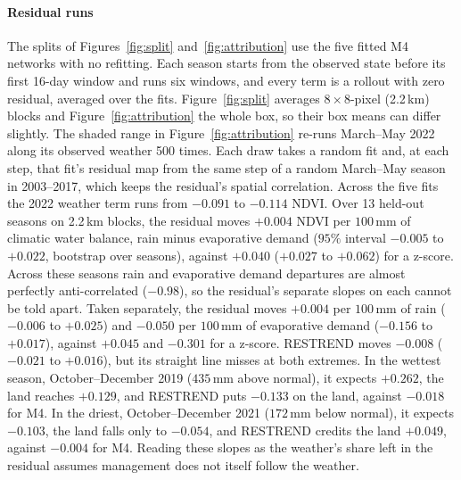 \documentclass[letterpaper]{article} %
\begin{document}
\paragraph{Residual runs} The splits of Figures~\ref{fig:split} and~\ref{fig:attribution} use the five fitted M4 networks with no refitting. Each season starts from the observed state before its first 16-day window and runs six windows, and every term is a rollout with zero residual, averaged over the fits. Figure~\ref{fig:split} averages $8\times8$-pixel (2.2\,km) blocks and Figure~\ref{fig:attribution} the whole box, so their box means can differ slightly. The shaded range in Figure~\ref{fig:attribution} re-runs March--May 2022 along its observed weather 500 times. Each draw takes a random fit and, at each step, that fit's residual map from the same step of a random March--May season in 2003--2017, which keeps the residual's spatial correlation. Across the five fits the 2022 weather term runs from $-0.091$ to $-0.114$ NDVI. Over 13 held-out seasons on 2.2\,km blocks, the residual moves $+0.004$ NDVI per $100$\,mm of climatic water balance, rain minus evaporative demand ($95\%$ interval $-0.005$ to $+0.022$, bootstrap over seasons), against $+0.040$ ($+0.027$ to $+0.062$) for a z-score. Across these seasons rain and evaporative demand departures are almost perfectly anti-correlated ($-0.98$), so the residual's separate slopes on each cannot be told apart. Taken separately, the residual moves $+0.004$ per $100$\,mm of rain ($-0.006$ to $+0.025$) and $-0.050$ per $100$\,mm of evaporative demand ($-0.156$ to $+0.017$), against $+0.045$ and $-0.301$ for a z-score. RESTREND moves $-0.008$ ($-0.021$ to $+0.016$), but its straight line misses at both extremes. In the wettest season, October--December 2019 ($435$\,mm above normal), it expects $+0.262$, the land reaches $+0.129$, and RESTREND puts $-0.133$ on the land, against $-0.018$ for M4. In the driest, October--December 2021 ($172$\,mm below normal), it expects $-0.103$, the land falls only to $-0.054$, and RESTREND credits the land $+0.049$, against $-0.004$ for M4. Reading these slopes as the weather's share left in the residual assumes management does not itself follow the weather.
\end{document}
